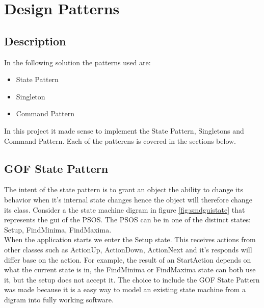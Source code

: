 \section{Design Patterns} \label{designpatterns}

\subsection{Description}

\noindent{}

In the following solution the patterns   used are:
\begin{itemize}
	\item State Pattern
	\item Singleton
	\item Command Pattern
\end{itemize}

In this project it made sense to implement the State Pattern, Singletons and Command Pattern. Each of the patterens is covered in the sections below.

\subsection{GOF State Pattern}
The intent of the state pattern is to grant an object the ability to change its behavior when it's internal state changes hence the object will therefore change its class. Consider a the state machine digram in figure \ref{fig:smdguistate} that represents the gui of the PSOS. The PSOS can be in one of the distinct states: Setup, FindMinima, FindMaxima. \\

When the application starts we enter the Setup state. This receives actions from other classes such as ActionUp, ActionDown, ActionNext and it's responds will differ base on the action. For example, the result of an StartAction depends on what the current state is in, the FindMinima or FindMaxima state can both use it, but the setup does not accept it. The choice to include the GOF State Pattern was made because it is a easy way to model an existing state machine from a digram into fully working software. \\

